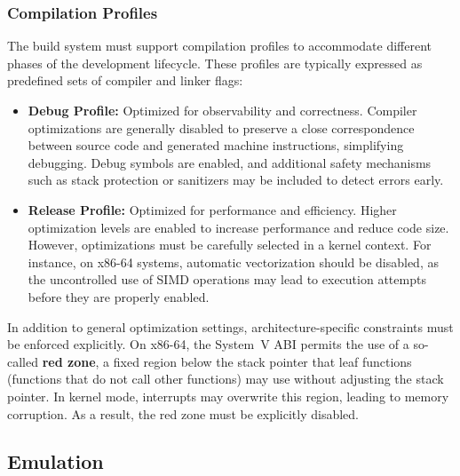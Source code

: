 \documentclass[a4paper,10pt,twoside]{report}
\theoremstyle{definition}
\begin{document}
\subsubsection{Compilation Profiles}

The build system must support compilation profiles to accommodate different phases of the development lifecycle. These profiles are typically expressed as predefined sets of compiler and linker flags:

\begin{itemize}
    \item \textbf{Debug Profile:} Optimized for observability and correctness. Compiler optimizations are generally disabled to preserve a close correspondence between source code and generated machine instructions, simplifying debugging. Debug symbols are enabled, and additional safety mechanisms such as stack protection or sanitizers may be included to detect errors early.
    
    \item \textbf{Release Profile:} Optimized for performance and efficiency. Higher optimization levels are enabled to increase performance and reduce code size. However, optimizations must be carefully selected in a kernel context. For instance, on x86-64 systems, automatic vectorization should be disabled, as the uncontrolled use of SIMD operations may lead to execution attempts before they are properly enabled.
\end{itemize}

In addition to general optimization settings, architecture-specific constraints must be enforced explicitly. On x86-64, the System~V ABI permits the use of a so-called \textbf{red zone}, a fixed region below the stack pointer that leaf functions (functions that do not call other functions) may use without adjusting the stack pointer. In kernel mode, interrupts may overwrite this region, leading to memory corruption. As a result, the red zone must be explicitly disabled.

\subsection{Emulation}
\end{document}
